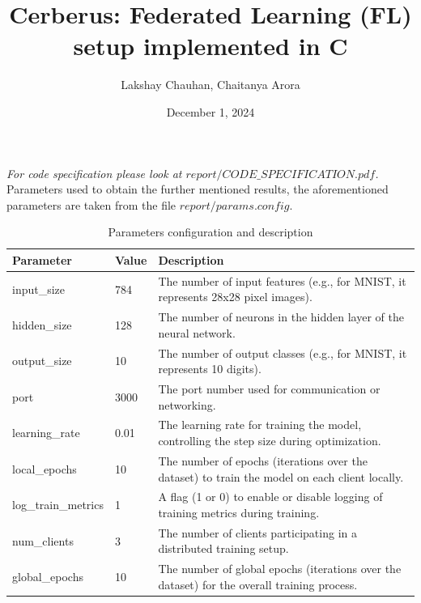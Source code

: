 \documentclass[12pt]{article}
\title{Cerberus: Federated Learning (FL) setup implemented in C}
\author{Lakshay Chauhan, Chaitanya Arora}
\date{December 1, 2024}
\begin{document}
	
	\maketitle
	
	\noindent \textit{For code specification please look at \(report/CODE\_SPECIFICATION.pdf\).}
	\\

	\noindent Parameters used to obtain the further mentioned results, the aforementioned parameters are taken from the file \(report/params.config\).
		
	\begin{table}[h!]
		\centering
		\begin{tabular}{|l|l|p{8cm}|}  %
			\hline
			\textbf{Parameter}         & \textbf{Value}      & \textbf{Description}  \\ \hline
			input\_size                & 784                 & The number of input features (e.g., for MNIST, it represents 28x28 pixel images). \\ \hline
			hidden\_size               & 128                 & The number of neurons in the hidden layer of the neural network. \\ \hline
			output\_size               & 10                  & The number of output classes (e.g., for MNIST, it represents 10 digits). \\ \hline
			port                       & 3000                & The port number used for communication or networking. \\ \hline
			learning\_rate             & 0.01                & The learning rate for training the model, controlling the step size during optimization. \\ \hline
			local\_epochs              & 10                  & The number of epochs (iterations over the dataset) to train the model on each client locally. \\ \hline
			log\_train\_metrics        & 1                   & A flag (1 or 0) to enable or disable logging of training metrics during training. \\ \hline
			num\_clients               & 3                   & The number of clients participating in a distributed training setup. \\ \hline
			global\_epochs             & 10                  & The number of global epochs (iterations over the dataset) for the overall training process. \\ \hline
		\end{tabular}
		\caption{Parameters configuration and description}
		\label{tab:config_parameters}
	\end{table}
	
\end{document}
